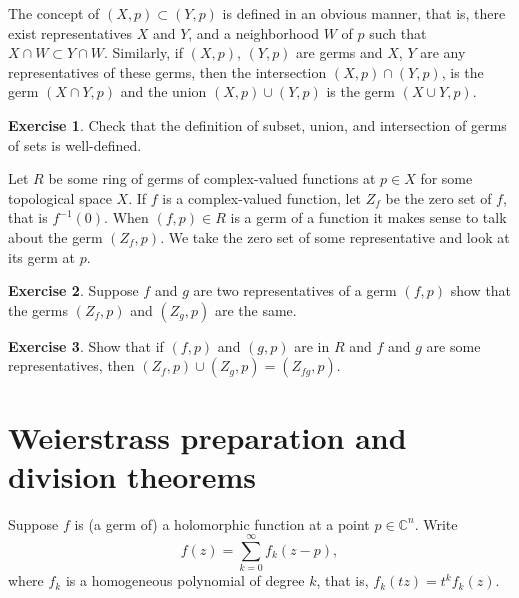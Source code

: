 \documentclass[12pt,openany]{book}
\newcommand{\C}{{\mathbb{C}}}
\theoremstyle{plain}
\theoremstyle{remark}
\theoremstyle{definition}
\newenvironment{exbox}{%
    \def\FrameCommand{\vrule width 1pt \relax\hspace{10pt}}%
    \MakeFramed{\advance\hsize-\width\FrameRestore}%
}{%
    \endMakeFramed
}
\theoremstyle{exercise}
\newtheorem{exercise}{Exercise}[section]
\theoremstyle{example}
\begin{document}
The concept of $(X,p) \subset (Y,p)$ is defined in an obvious manner,
that is, there exist representatives $X$ and $Y$, and a neighborhood $W$
of $p$ such that $X \cap W \subset Y \cap W$.
Similarly,
if $(X,p)$, $(Y,p)$ are germs and $X$, $Y$
are any representatives of these germs, then
the intersection $(X,p) \cap (Y,p)$,
is the germ $(X \cap Y,p)$ and the union
$(X,p) \cup (Y,p)$ is the germ $(X \cup Y,p)$.

\begin{exbox}
\begin{exercise}
Check that the definition of
subset, union, and intersection of germs
of sets
is well-defined.
\end{exercise}
\end{exbox}


Let $R$ be some ring of germs of complex-valued
functions at $p \in X$ for some topological space $X$.
%
If $f$ is a complex-valued function,
let $Z_f$ be the zero set of $f$, that is $f^{-1}(0)$.
When $(f,p) \in R$ is a germ of a function
it makes sense to talk about the germ $(Z_f,p)$.  We take the zero
set of some representative and look at its germ at $p$.

\begin{exbox}
\begin{exercise}
Suppose $f$ and $g$ are two representatives of a germ $(f,p)$
show that the germs $(Z_f,p)$ and $(Z_g,p)$ are the same.
\end{exercise}

\begin{exercise}
Show that if $(f,p)$ and $(g,p)$ are in $R$
and $f$ and $g$ are some representatives, then
$(Z_f,p) \cup (Z_g,p) = (Z_{fg},p)$.
\end{exercise}
\end{exbox}


\section{Weierstrass preparation and division theorems} \label{sec:wpt}

Suppose
$f$ is (a germ of) a holomorphic function at a point $p \in \C^n$.
Write
\begin{equation*}
f(z) = \sum_{k=0}^\infty f_k(z-p),
\end{equation*}
where $f_k$ is a homogeneous polynomial of degree $k$,
that is, $f_k(tz) = t^k f_k(z)$.
\end{document}
